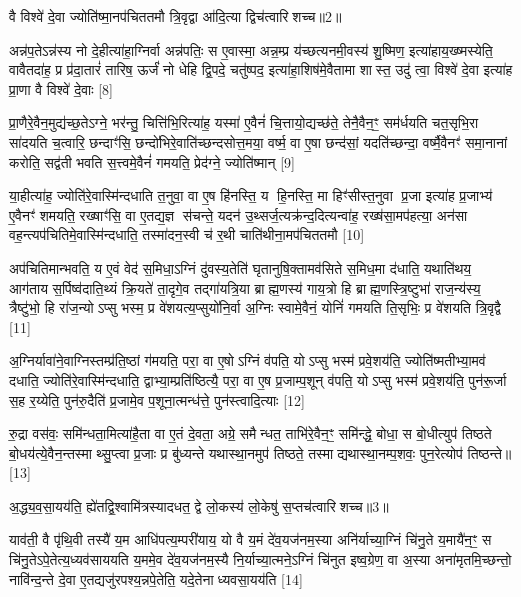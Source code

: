 {\scriptsize {वै विश्वे॑ दे॒वा ज्योति॑ष्मा॒नप॑चिततमौ त्रि॒वृद्वा आ॑दि॒त्या द्विच॑त्वारिशच्च॥2॥}}

अन्न॑प॒तेऽन्न॑स्य नो दे॒हीत्या॑हा॒ग्निर्वा अन्न॑पतिः॒ स ए॒वास्मा॒ अन्न॒म्प्र य॑च्छत्यनमी॒वस्य॑ शु॒ष्मिण॒ इत्या॑हाय॒ख्ष्मस्येति॒ वावैतदा॑ह॒ प्र प्र॑दा॒तारं॑ तारिष॒ ऊर्जं॑ नो धेहि द्वि॒पदे॒ चतु॑ष्पद॒ इत्या॑हा॒शिष॑मे॒वैतामा शास्त॒ उदु॑ त्वा॒ विश्वे॑ दे॒वा इत्या॑ह प्रा॒णा वै विश्वे॑ दे॒वाः [8]

प्रा॒णैरे॒वैन॒मुद्य॑च्छ॒तेऽग्ने॒ भर॑न्तु॒ चित्ति॑भि॒रित्या॑ह॒ यस्मा॑ ए॒वैनं॑ चि॒त्तायो॒द्यच्छ॑ते॒ तेनै॒वैन॒ꣳ॒ सम॑र्धयति चत॒सृभि॒रा सा॑दयति च॒त्वारि॒ छन्दाꣳ॑सि॒ छन्दो॑भिरे॒वाति॑च्छन्दसोत्त॒मया॒ वर्ष्म॒ वा ए॒षा छन्द॑सां॒ यदति॑च्छन्दा॒ वर्ष्मै॒वैनꣳ॑ समा॒नानां करोति॒ सद्व॑ती भवति स॒त्त्वमे॒वैनं॑ गमयति॒ प्रेद॑ग्ने॒ ज्योति॑ष्मान् [9]

या॒हीत्या॑ह॒ ज्योति॑रे॒वास्मि॑न्दधाति त॒नुवा॒ वा ए॒ष हि॑नस्ति॒ य हि॒नस्ति॒ मा हिꣳ॑सीस्त॒नुवा प्र॒जा इत्या॑ह प्र॒जाभ्य॑ ए॒वैनꣳ॑ शमयति॒ रख्षाꣳ॑सि॒ वा ए॒तद्य॒ज्ञ स॑चन्ते॒ यदन॑ उ॒थ्सर्ज॒त्यक्र॑न्द॒दित्यन्वा॑ह॒ रख्ष॑सा॒मप॑हत्या॒ अन॑सा वह॒न्त्यप॑चितिमे॒वास्मि॑न्दधाति॒ तस्मा॑दन॒स्वी च॑ र॒थी चाति॑थीना॒मप॑चिततमौ [10]

अप॑चितिमान्भवति॒ य ए॒वं वेद॑ स॒मिधा॒ऽग्निं दु॑वस्य॒तेति॑ घृतानुषि॒क्तामव॑सिते स॒मिध॒मा द॑धाति॒ यथाति॑थय॒ आग॑ताय स॒र्पिष्व॑दाति॒थ्यं क्रि॒यते॑ ता॒दृगे॒व तद्गा॑यत्रि॒या ब्राह्म॒णस्य॑ गाय॒त्रो हि ब्राह्म॒णस्त्रि॒ष्टुभा॑ राज॒न्य॑स्य॒ त्रैष्टु॑भो॒ हि रा॑ज॒न्योऽप्सु भस्म॒ प्र वे॑शयत्य॒प्सुयो॑नि॒र्वा अ॒ग्निः स्वामे॒वैनं॒ योनिं॑ गमयति ति॒सृभिः॒ प्र वे॑शयति त्रि॒वृद्वै [11]

अ॒ग्निर्यावा॑ने॒वाग्निस्तम्प्र॑ति॒ष्ठां ग॑मयति॒ परा॒ वा ए॒षोऽग्निं व॑पति॒ योऽप्सु भस्म॑ प्रवे॒शय॑ति॒ ज्योति॑ष्मतीभ्या॒मव॑ दधाति॒ ज्योति॑रे॒वास्मि॑न्दधाति॒ द्वाभ्या॒म्प्रति॑ष्ठित्यै॒ परा॒ वा ए॒ष प्र॒जाम्प॒शून् व॑पति॒ योऽप्सु भस्म॑ प्रवे॒शय॑ति॒ पुन॑रू॒र्जा स॒ह र॒य्येति॒ पुन॑रु॒दैति॑ प्र॒जामे॒व प॒शूना॒त्मन्ध॑त्ते॒ पुन॑स्त्वादि॒त्याः [12]

रु॒द्रा वस॑वः॒ समि॑न्धता॒मित्या॑है॒ता वा ए॒तं दे॒वता॒ अग्रे॒ समैन्धत॒ ताभि॑रे॒वैन॒ꣳ॒ समि॑न्द्धे॒ बोधा॒ स बो॒धीत्युप॑ तिष्ठते बो॒धय॑त्ये॒वैन॒न्तस्माथ्सु॒प्त्वा प्र॒जाः प्र बु॑ध्यन्ते यथास्था॒नमुप॑ तिष्ठते॒ तस्माद्यथास्था॒नम्प॒शवः॒ पुन॒रेत्योप॑ तिष्ठन्ते॥ [13]

{\scriptsize {अ॒द्ध्य॒व॒सा॒यय॑ति॒ ह्ये॑तद्वि॒श्वामि॑त्रस्यादधत॒ द्वे लो॒कस्य॑ लो॒केषु॑ स॒प्तच॑त्वारिशच्च॥3॥}}

याव॑ती॒ वै पृ॑थि॒वी तस्यै॑ य॒म आधि॑पत्य॒म्परी॑याय॒ यो वै य॒मं दे॑व॒यज॑नम॒स्या अनि॑र्याच्या॒ग्निं चि॑नु॒ते य॒मायै॑न॒ꣳ॒ स चि॑नु॒तेऽपे॒तेत्य॒ध्यव॑साययति य॒ममे॒व दे॑व॒यज॑नम॒स्यै नि॒र्याच्या॒त्मने॒ऽग्निं चि॑नुत इष्व॒ग्रेण॒ वा अ॒स्या अना॑मृतमि॒च्छन्तो॒ नावि॑न्द॒न्ते दे॒वा ए॒तद्यजु॑रपश्य॒न्नपे॒तेति॒ यदे॒तेनाध्यवसा॒यय॑ति [14]

